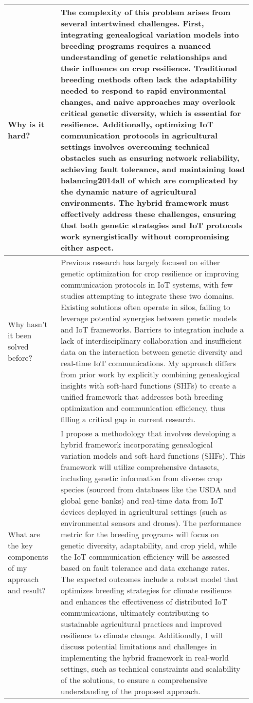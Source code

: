 \begin{table*}[htbp]
\begin{tabular}{p{3.5cm}p{12cm}}
\\ \midrule
Why is it hard? & 
The complexity of this problem arises from several intertwined challenges. First, integrating genealogical variation models into breeding programs requires a nuanced understanding of genetic relationships and their influence on crop resilience. Traditional breeding methods often lack the adaptability needed to respond to rapid environmental changes, and naive approaches may overlook critical genetic diversity, which is essential for resilience. Additionally, optimizing IoT communication protocols in agricultural settings involves overcoming technical obstacles such as ensuring network reliability, achieving fault tolerance, and maintaining load balancing\u2014all of which are complicated by the dynamic nature of agricultural environments. The hybrid framework must effectively address these challenges, ensuring that both genetic strategies and IoT protocols work synergistically without compromising either aspect.
\\ \midrule
Why hasn't it been solved before? & 
Previous research has largely focused on either genetic optimization for crop resilience or improving communication protocols in IoT systems, with few studies attempting to integrate these two domains. Existing solutions often operate in silos, failing to leverage potential synergies between genetic models and IoT frameworks. Barriers to integration include a lack of interdisciplinary collaboration and insufficient data on the interaction between genetic diversity and real-time IoT communications. My approach differs from prior work by explicitly combining genealogical insights with soft-hard functions (SHFs) to create a unified framework that addresses both breeding optimization and communication efficiency, thus filling a critical gap in current research.\\ \midrule
What are the key components of my approach and result? & 
I propose a methodology that involves developing a hybrid framework incorporating genealogical variation models and soft-hard functions (SHFs). This framework will utilize comprehensive datasets, including genetic information from diverse crop species (sourced from databases like the USDA and global gene banks) and real-time data from IoT devices deployed in agricultural settings (such as environmental sensors and drones). The performance metric for the breeding programs will focus on genetic diversity, adaptability, and crop yield, while the IoT communication efficiency will be assessed based on fault tolerance and data exchange rates. The expected outcomes include a robust model that optimizes breeding strategies for climate resilience and enhances the effectiveness of distributed IoT communications, ultimately contributing to sustainable agricultural practices and improved resilience to climate change. Additionally, I will discuss potential limitations and challenges in implementing the hybrid framework in real-world settings, such as technical constraints and scalability of the solutions, to ensure a comprehensive understanding of the proposed approach.\\ 

\end{tabular}
\end{table*}
